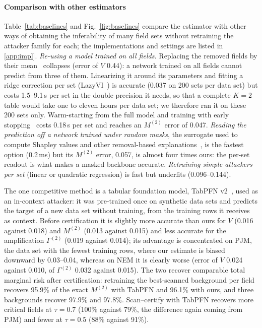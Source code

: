 \paragraph{Comparison with other estimators}
Table~\ref{tab:baselines} and Fig.~\ref{fig:baselines} compare the estimator with other ways of obtaining the
inferability of many field sets without retraining the attacker family for each; the implementations and settings are listed in \ref{app:impl}.
\emph{Re-using a model trained on all fields.} Replacing the removed fields by their mean~\cite{williamson2020spvim}
collapses (error of $V$ 0.44): a network trained on all fields cannot predict from three of them. Linearizing it around its
parameters and fitting a ridge correction per set (LazyVI~\cite{gao2022lazyvi}) is accurate (0.037 on 200 sets per data set)
but costs 1.5--9.1\,s per set in the double precision it needs, so that a complete $K=2$ table would take one to eleven hours
per data set; we therefore ran it on these 200 sets only. Warm-starting from the full model and training with early
stopping~\cite{sun2025warmstart} costs 0.18\,s per set and reaches an $M^{(2)}$ error of 0.047. \emph{Reading the prediction
off a network trained under random masks}, the surrogate used to compute Shapley values and other removal-based
explanations~\cite{covert2021explaining,jethani2022fastshap}, is the fastest option (0.2\,ms) but its $M^{(2)}$ error, 0.057, is
almost four times ours: the per-set readout is what makes a masked backbone accurate. \emph{Retraining simple attackers per
set} (linear or quadratic regression) is fast but underfits (0.096--0.144).

The one competitive method is a tabular foundation model, TabPFN v2~\cite{hollmann2025tabpfn}, used as an in-context
attacker: it was pre-trained once on synthetic data sets and predicts the target of a new data set without training, from the
training rows it receives as context. Before certification it is slightly more accurate than ours for $V$ (0.016 against
0.018) and $M^{(2)}$ (0.013 against 0.015) and less accurate for the amplification $\Gamma^{(2)}$ (0.019 against 0.014); its
advantage is concentrated on PJM, the data set with the fewest training rows, where our estimate is biased downward by
0.03--0.04, whereas on NEM it is clearly worse (error of $V$ 0.024 against 0.010, of $\Gamma^{(2)}$ 0.032 against 0.015). The two recover comparable total marginal risk after certification: retraining the best-scanned background per field recovers 95.9\% of the exact
$M^{(2)}$ with TabPFN and 96.1\% with ours, and three backgrounds recover 97.9\% and 97.8\%. Scan--certify with TabPFN recovers
more critical fields at $\tau=0.7$ (100\% against 79\%, the difference again coming from PJM) and fewer at $\tau=0.5$ (88\%
against 91\%).

